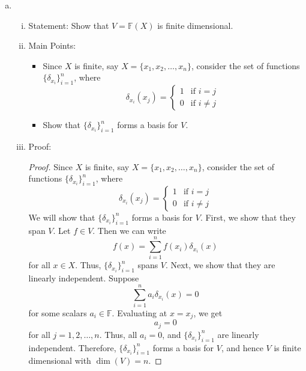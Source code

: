 \documentclass{article}
\begin{document}
\begin{enumerate}[a)]
        \item \begin{enumerate}[i)]
            \item Statement: Show that $V = \mathbb{F}(X)$ is finite dimensional.
            \item Main Points:
                \begin{itemize}
                    \item Since $X$ is finite, say $X = \{x_1, x_2, \ldots, x_n\}$, consider the set of functions $\{\delta_{x_i}\}_{i=1}^n$, where
                    \[
                        \delta_{x_i}(x_j) = \begin{cases}
                            1 & \text{if } i = j \\
                            0 & \text{if } i \neq j
                        \end{cases}
                    \]
                    \item Show that $\{\delta_{x_i}\}_{i=1}^n$ forms a basis for $V$.
                \end{itemize}
            \item Proof:
            \begin{proof}
                Since $X$ is finite, say $X = \{x_1, x_2, \ldots, x_n\}$, consider the set of functions $\{\delta_{x_i}\}_{i=1}^n$, where
                \[
                    \delta_{x_i}(x_j) = \begin{cases}
                        1 & \text{if } i = j \\
                        0 & \text{if } i \neq j
                    \end{cases}
                \]
                We will show that $\{\delta_{x_i}\}_{i=1}^n$ forms a basis for $V$. First, we show that they span $V$. Let $f \in V$. Then we can write
                \[
                    f(x) = \sum_{i=1}^n f(x_i) \delta_{x_i}(x)
                \]
                for all $x \in X$. Thus, $\{\delta_{x_i}\}_{i=1}^n$ spans $V$. Next, we show that they are linearly independent. Suppose
                \[
                    \sum_{i=1}^n a_i \delta_{x_i}(x) = 0
                \]
                for some scalars $a_i \in \mathbb{F}$. Evaluating at $x = x_j$, we get
                \[
                    a_j = 0
                \]
                for all $j = 1, 2, \ldots, n$. Thus, all $a_i = 0$, and $\{\delta_{x_i}\}_{i=1}^n$ are linearly independent. Therefore, $\{\delta_{x_i}\}_{i=1}^n$ forms a basis for $V$, and hence $V$ is finite dimensional with $\dim(V) = n$.
            \end{proof}
        \end{enumerate}
    \end{enumerate}
\end{document}
